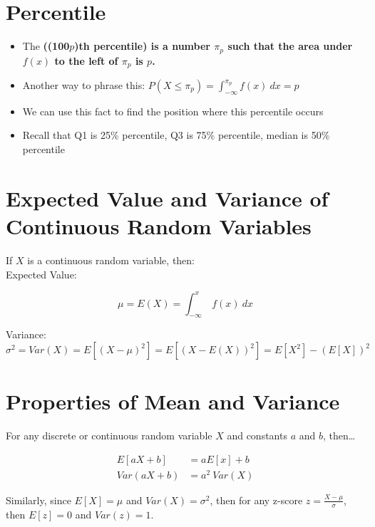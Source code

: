 \section{Percentile}

\begin{itemize}
    \item The \bf({(100$p$})th percentile) is a number $\pi_p$ such that the area under $f(x)$ to the left of $\pi_p$ is $p$.
    \item Another way to phrase this: $P(X \le \pi_p) = \int_{-\infty}^{\pi_p}f(x)\:dx = p$
    \item We can use this fact to find the position where this percentile occurs
    \item Recall that Q1 is 25\% percentile, Q3 is 75\% percentile, median is 50\% percentile 
\end{itemize}

\section{Expected Value and Variance of Continuous Random Variables}

If $X$ is a continuous random variable, then:\\

Expected Value:

$$
    \mu = E(X) = \int_{-\infty}^ x\:f(x)\:dx
$$

Variance:
$$
    \sigma^2 = Var(X) = E[(X - \mu)^2] = E[(X - E(X))^2] = E[X^2] - (E[X])^2
$$


\section{Properties of Mean and Variance}

For any discrete or continuous random variable $X$ and constants $a$ and $b$, then\dots

$$
    \begin{aligned}
        E[aX + b] &= aE[x]+b\\
        Var(aX+b) &= a^2\:Var(X)
    \end{aligned}
$$

Similarly, since $E[X] = \mu$ and $Var(X) = \sigma^2$, then for any z-score $z = \frac{X-\mu}{\sigma}$, then $E[z] = 0$ and $Var(z) = 1$.